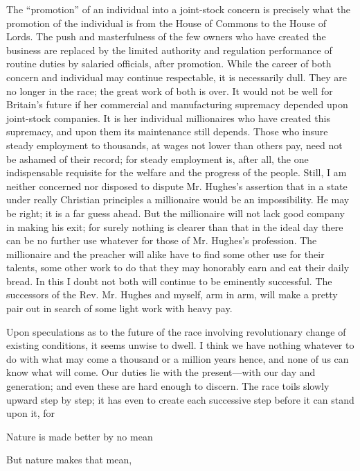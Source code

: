 \documentclass[11pt,openany]{book}
\begin{document}
The ``promotion'' of an individual into a joint-stock concern is precisely what the promotion of the individual is from the House of Commons to the House of Lords. The push and masterfulness of the few owners who have created the business are replaced by the limited authority and regulation performance of routine duties by salaried officials, after promotion. While the career of both concern and individual may continue respectable, it is necessarily dull. They are no longer in the race; the great work of both is over. It would not be well for Britain's future if her commercial and manufacturing supremacy depended upon joint-stock companies. It is her individual millionaires who have created this supremacy, and upon them its maintenance still depends. Those who insure steady employment to thousands, at wages not lower than others pay, need not be ashamed of their record; for steady employment is, after all, the one indispensable requisite for the welfare and the progress of the people. Still, I am neither concerned nor disposed to dispute Mr. Hughes's assertion that in a state under really Christian principles a millionaire would be an impossibility. He may be right; it is a far guess ahead. But the millionaire will not lack good company in making his exit; for surely nothing is clearer than that in the ideal day there can be no further use whatever for those of Mr. Hughes's profession. The millionaire and the preacher will alike have to find some other use for their talents, some other work to do that they may honorably earn and eat their daily bread. In this I doubt not both will continue to be eminently successful. The successors of the Rev. Mr. Hughes and myself, arm in arm, will make a pretty pair out in search of some light work with heavy pay.

Upon speculations as to the future of the race involving revolutionary change of existing conditions, it seems unwise to dwell. I think we have nothing whatever to do with what may come a thousand or a million years hence, and none of us can know what will come. Our duties lie with the present---with our day and generation; and even these are hard enough to discern. The race toils slowly upward step by step; it has even to create each successive step before it can stand upon it, for

Nature is made better by no mean

But nature makes that mean,
\end{document}
